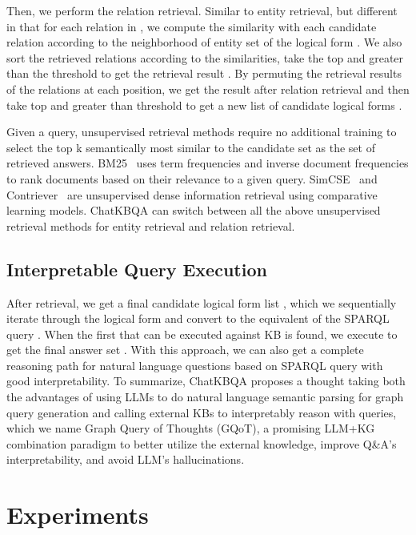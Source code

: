 \documentclass{article} \usepackage{iclr2024_conference,times}
\begin{document}
Then, we perform the relation retrieval. Similar to entity retrieval, but different in that for each relation  in , we compute the similarity  with each candidate relation  according to the neighborhood of entity set of the logical form . We also sort the retrieved relations according to the similarities, take the top  and greater than the threshold  to get the retrieval result . By permuting the retrieval results of the relations at each position, we get the result  after relation retrieval and then take top  and greater than threshold  to get a new list of candidate logical forms .

Given a query, unsupervised retrieval methods require no additional training to select the top k semantically most similar to the candidate set as the set of retrieved answers. BM25~\citep{BM25} uses term frequencies and inverse document frequencies to rank documents based on their relevance to a given query. SimCSE~\citep{SimCSE} and Contriever~\citep{Contriever} are unsupervised dense information retrieval using comparative learning models. ChatKBQA can switch between all the above unsupervised retrieval methods for entity retrieval and relation retrieval. 

\subsection{Interpretable Query Execution}

After retrieval, we get a final candidate logical form list , which we sequentially iterate through the logical form  and convert to the equivalent of the SPARQL query . When the first  that can be executed against KB  is found, we execute to get the final answer set . With this approach, we can also get a complete reasoning path for natural language questions based on SPARQL query with good interpretability. To summarize, ChatKBQA proposes a thought taking both the advantages of using LLMs to do natural language semantic parsing for graph query generation and calling external KBs to interpretably reason with queries, which we name Graph Query of Thoughts (GQoT), a promising LLM+KG combination paradigm to better utilize the external knowledge, improve Q\&A's interpretability, and avoid LLM's hallucinations.



\section{Experiments}
\end{document}
